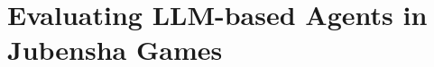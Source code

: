 \documentclass[11pt]{article}
\begin{document}
\section{Evaluating LLM-based Agents in Jubensha Games}











\end{document}
